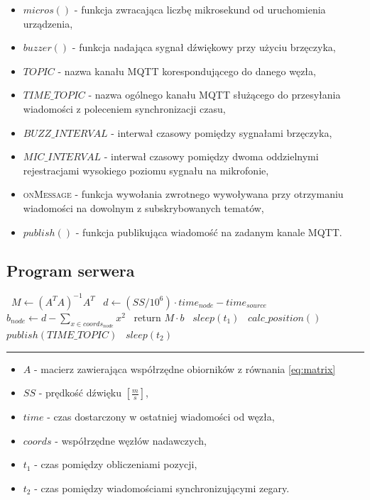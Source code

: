 \begin{itemize}
    \item $micros()$ {-} funkcja zwracająca liczbę mikrosekund od uruchomienia urządzenia,
    \item $buzzer()$ {-} funkcja nadająca sygnał dźwiękowy przy użyciu brzęczyka,
    \item $TOPIC$ {-} nazwa kanału MQTT korespondującego do danego węzła,
    \item $TIME\_TOPIC$ {-} nazwa ogólnego kanału MQTT służącego do przesyłania wiadomości z poleceniem synchronizacji czasu,
    \item $BUZZ\_INTERVAL$ {-} interwał czasowy pomiędzy sygnałami brzęczyka,
    \item $MIC\_INTERVAL$ {-} interwał czasowy pomiędzy dwoma oddzielnymi rejestracjami wysokiego poziomu sygnału na mikrofonie,
    \item \textsc{onMessage} {-} funkcja wywołania zwrotnego wywoływana przy otrzymaniu wiadomości na dowolnym z subskrybowanych tematów,
    \item $publish()$ {-} funkcja publikująca wiadomość na zadanym kanale MQTT.
\end{itemize}

\subsection{Program serwera}

\begin{center}
    \begin{algorithmic}[1]
        \State\ $M \gets {\left(A^T A\right)}^{-1} A^T$
        \State\ $d \gets (SS / 10^{6}) \cdot time_{node} - time_{source}$
        \State\ $b_{node} \gets d - \sum_{x \in coords_{node}}{x^2}$
        \EndFor
        \State\ return $M \cdot b$
        \EndFunction
        \State\ $sleep(t_1)$
        \State\ $calc\_position()$
        \EndLoop
        \State\ $publish(TIME\_TOPIC)$
        \State\ $sleep(t_2)$
        \EndLoop
    \end{algorithmic}
    \vspace{5pt}
    \hrule
    \label{alg:server}
\end{center}

\begin{itemize}
    \item $A$ - macierz zawierająca współrzędne obiorników z równania \ref{eq:matrix}
    \item $SS$ {-} prędkość dźwięku $\left[\frac{m}{s}\right]$,
    \item $time$ {-} czas dostarczony w ostatniej wiadomości od węzła,
    \item $coords$ {-} współrzędne węzłów nadawczych,
    \item $t_1$ {-} czas pomiędzy obliczeniami pozycji,
    \item $t_2$ {-} czas pomiędzy wiadomościami synchronizującymi zegary.
\end{itemize}

